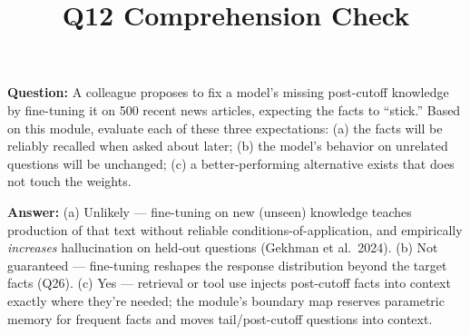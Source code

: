 \documentclass[11pt]{article}
\title{Q12 Comprehension Check}
\date{}
\begin{document}
\maketitle
\textbf{Question:} A colleague proposes to fix a model's missing post-cutoff knowledge by fine-tuning it on 500 recent news articles, expecting the facts to ``stick.'' Based on this module, evaluate each of these three expectations: (a) the facts will be reliably recalled when asked about later; (b) the model's behavior on unrelated questions will be unchanged; (c) a better-performing alternative exists that does not touch the weights.

\vspace{1em}
\textbf{Answer:} (a) Unlikely --- fine-tuning on new (unseen) knowledge teaches production of that text without reliable conditions-of-application, and empirically \emph{increases} hallucination on held-out questions (Gekhman et al.\ 2024). (b) Not guaranteed --- fine-tuning reshapes the response distribution beyond the target facts (Q26). (c) Yes --- retrieval or tool use injects post-cutoff facts into context exactly where they're needed; the module's boundary map reserves parametric memory for frequent facts and moves tail/post-cutoff questions into context.
\end{document}
